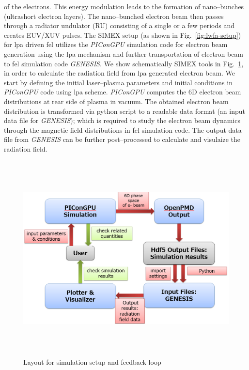 of the electrons. This energy modulation leads to the formation of nano--bunches
(ultrashort electron layers). The nano--bunched electron beam then passes through
a radiator undulator (RU) consisting of a single or a few periods and creates
EUV/XUV pulses.
%
The SIMEX setup (as shown in Fig.~\ref{fig:lwfa-setup}) for \gls{lpa} driven \gls{fel}
utilizes the \textit{PIConGPU} simulation code for electron beam generation using the \gls{lpa}
mechanism and further transportation of electron beam to \gls{fel} simulation code
\textit{GENESIS}. We show schematically SIMEX tools in
Fig.~\ref{fig:lwfa-simulation_loop}, in order to calculate the radiation field
from \gls{lpa} generated electron beam. We start by defining the initial laser--plasma
parameters and initial conditions in \textit{PIConGPU} code using \gls{lpa} scheme.
\textit{PIConGPU} computes the 6D electron beam distributions at rear
side of  plasma in vacuum. The obtained electron beam distribution is
transformed via python script to a readable data format (an input data file for
\textit{GENESIS}); which is required to study the electron beam dynamics through the
magnetic field distributions in \gls{fel} simulation code. The output data file from
\textit{GENESIS} can be further post--processed to calculate and visulaize the radiation
field.

\begin{figure}[ht]
  \begin{center}%
    \includegraphics[width=5.9425in,height=4.1882in]{figures/lwfafel-img002.png}
    \caption{Layout for simulation setup and feedback loop}
    \label{fig:lwfa-simulation_loop}
  \end{center}%
\end{figure}
%
